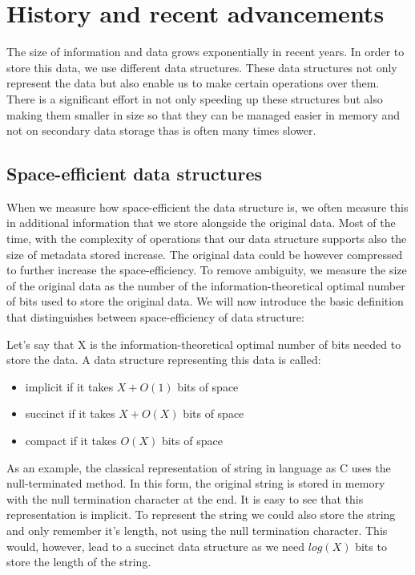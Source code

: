 \chapter{History and recent advancements}
\label{kap:kap1}

The size of information and data grows exponentially in recent years. In order to store this data, we use different data structures. These data structures not only represent the data but also enable us to make certain operations over them. There is a significant effort in not only speeding up these structures but also making them smaller in size so that they can be managed easier in memory and not on secondary data storage thas is often many times slower.

\section{Space-efficient data structures}

When we measure how space-efficient the data structure is, we often measure this in additional information that we store alongside the original data. Most of the time, with the complexity of operations that our data structure supports also the size of metadata stored increase. The original data could be however compressed to further increase the space-efficiency. To remove ambiguity, we measure the size of the original data as the number of the information-theoretical optimal number of bits used to store the original data. We will now introduce the basic definition that distinguishes between space-efficiency of data structure:

Let's say that X is the information-theoretical optimal number of bits needed to store the data. A data structure representing this data is called:
\begin{itemize}
\item implicit if it takes $X + O(1)$ bits of space
\item succinct if it takes $X + O(X)$ bits of space
\item compact if it takes $O(X)$ bits of space
\end{itemize}

As an example, the classical representation of string in language as C uses the null-terminated method. In this form, the original string is stored in memory with the null termination character at the end. It is easy to see that this representation is implicit. To represent the string we could also store the string and only remember it's length, not using the null termination character. This would, however, lead to a succinct data structure as we need $log(X)$ bits to store the length of the string.

